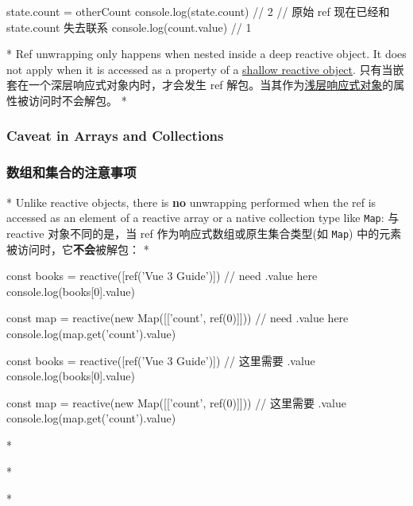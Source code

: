 \begin{paracol}{2}
\begin{codeJs}
state.count = otherCount
console.log(state.count) // 2
// 原始 ref 现在已经和 state.count 失去联系
console.log(count.value) // 1
\end{codeJs}
\switchcolumn[0]*%
Ref unwrapping only happens when nested inside a deep reactive object.
It does not apply when it is accessed as a property of a
\href{https://vuejs.org/api/reactivity-advanced.html\#shallowreactive}{shallow
reactive object}.
\switchcolumn
只有当嵌套在一个深层响应式对象内时，才会发生 ref
解包。当其作为\href{https://cn.vuejs.org/api/reactivity-advanced.html\#shallowreactive}{浅层响应式对象}的属性被访问时不会解包。
\switchcolumn[0]*%
\subsubsection{Caveat in Arrays and Collections}
\switchcolumn
\subsubsection{数组和集合的注意事项}
\switchcolumn[0]*%
Unlike reactive objects, there is \textbf{no} unwrapping performed when
the ref is accessed as an element of a reactive array or a native
collection type like \texttt{Map}:
\switchcolumn
与 reactive 对象不同的是，当 ref 作为响应式数组或原生集合类型(如
\texttt{Map}) 中的元素被访问时，它\textbf{不会}被解包：
\switchcolumn[0]*%
\begin{codeJs}
const books = reactive([ref('Vue 3 Guide')])
// need .value here
console.log(books[0].value)

const map = reactive(new Map([['count', ref(0)]]))
// need .value here
console.log(map.get('count').value)
\end{codeJs}
\switchcolumn
\begin{codeJs}
const books = reactive([ref('Vue 3 Guide')])
// 这里需要 .value
console.log(books[0].value)

const map = reactive(new Map([['count', ref(0)]]))
// 这里需要 .value
console.log(map.get('count').value)
\end{codeJs}
\end{paracol}




\switchcolumn[0]*%
\begin{vueQuote}{}
\end{vueQuote} 
\switchcolumn
\begin{vueQuote}{}
\end{vueQuote} 

\switchcolumn[0]*%
\begin{codeJs}

\end{codeJs}  
\switchcolumn
\begin{codeJs}

\end{codeJs}  


\switchcolumn[0]*%
\begin{codeHtml}

\end{codeHtml}  
\switchcolumn
\begin{codeHtml}

\end{codeHtml}  